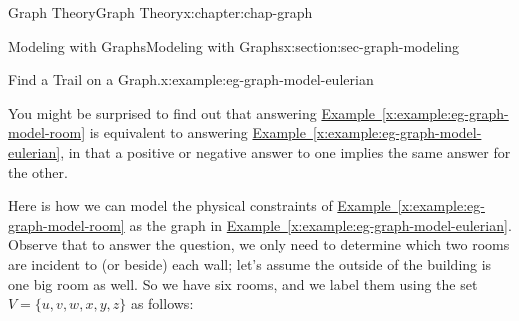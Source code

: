 \documentclass[oneside,10pt,]{book}
\newcommand{\xreffont}{\relax}
\numberwithin{equation}{section}
\begin{document}
\begin{chapterptx}{Graph Theory}{}{Graph Theory}{}{}{x:chapter:chap-graph}
\begin{sectionptx}{Modeling with Graphs}{}{Modeling with Graphs}{}{}{x:section:sec-graph-modeling}
\begin{example}{Find a Trail on a Graph.}{x:example:eg-graph-model-eulerian}
\begin{sidebyside}{1}{0.3}{0.3}{0}
\begin{sbspanel}{0.4}
{
}%
\end{sbspanel}%
\end{sidebyside}%
\end{example}
You might be surprised to find out that answering \hyperref[x:example:eg-graph-model-room]{Example~{\xreffont\ref{x:example:eg-graph-model-room}}} is equivalent to answering \hyperref[x:example:eg-graph-model-eulerian]{Example~{\xreffont\ref{x:example:eg-graph-model-eulerian}}}, in that a positive or negative answer to one implies the same answer for the other.%
\par
Here is how we can model the physical constraints of \hyperref[x:example:eg-graph-model-room]{Example~{\xreffont\ref{x:example:eg-graph-model-room}}} as the graph in \hyperref[x:example:eg-graph-model-eulerian]{Example~{\xreffont\ref{x:example:eg-graph-model-eulerian}}}. Observe that to answer the question, we only need to determine which two rooms are incident to (or beside) each wall; let's assume the outside of the building is one big room as well. So we have six rooms, and we label them using the set \(V = \{u,v,w,x,y,z\}\) as follows:%
\begin{sidebyside}{1}{0.325}{0.325}{0}%
\begin{sbspanel}{0.35}%
%
\end{sbspanel}%
\end{sidebyside}%

\end{sectionptx}
\end{chapterptx}
\end{document}

